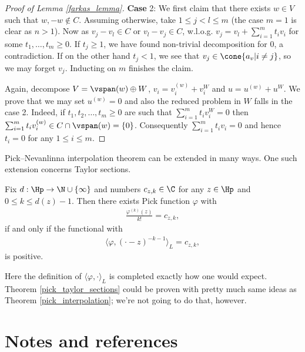 \begin{proof}[Proof of Lemma \ref{farkas_lemma}]
	\textbf{Case} 2: We first claim that there exists $w \in V$ such that $w, -w \notin C$. Assuming otherwise, take $1 \leq j < l \leq m$ (the case $m = 1$ is clear as $n > 1$). Now as $v_{j} - v_{l} \in C$ or $v_{l} - v_{j} \in C$, w.l.o.g. $v_{j} = v_{l} + \sum_{i = 1}^{m} t_{i} v_{i}$ for some $t_{1}, \ldots, t_{m} \geq 0$. If $t_{j} \geq 1$, we have found non-trivial decomposition for $0$, a contradiction. If on the other hand $t_{j} < 1$, we see that $v_{j} \in \cone\{a_{v} | i \neq j\}$, so we may forget $v_{j}$. Inducting on $m$ finishes the claim.

	Again, decompose $V = \vspan(w) \oplus W$, $v_{i} = v_{i}^{(w)} + v_{i}^{W}$ and $u = u^{(w)} + u^{W}$. We prove that we may set $u^{(w)} = 0$ and also the reduced problem in $W$ falls in the case 2. Indeed, if $t_{1}, t_{2}, \ldots, t_{m} \geq 0$ are such that $\sum_{i = 1}^{m} t_{i} v_{i}^{W} = 0$ then $\sum_{i = 1}^{m} t_{i} v_{i}^{(w)} \in C \cap \vspan(w) = \{0\}$. Consequently $\sum_{i = 1}^{m} t_{i} v_{i} = 0$ and hence $t_{i} = 0$ for any $1 \leq i \leq m$.
\end{proof}

\begin{huom}\label{taylor_section_rem}
	Pick--Nevanlinna interpolation theorem can be extended in many ways. One such extension concerns Taylor sections.
	\begin{lause}\label{pick_taylor_sections}
		Fix $d : \Hp \to \N \cup \{\infty\}$ and numbers $c_{z, k} \in \C$ for any $z \in \Hp$ and $0 \leq k \leq d(z) - 1$. Then there exists Pick function $\varphi$ with
		\begin{align*}
			\frac{\varphi^{(k)}(z)}{k!} = c_{z, k},
		\end{align*}
		if and only if the functional with
		\begin{align*}
			\langle \varphi, (\cdot - z)^{-k - 1}\rangle_{L} = c_{z, k},
		\end{align*}
		is positive.
	\end{lause}
	Here the definition of $\langle \varphi, \cdot\rangle_{L}$ is completed exactly how one would expect. Theorem \ref{pick_taylor_sections} could be proven with pretty much same ideas as Theorem \ref{pick_interpolation}; we're not going to do that, however.
\end{huom}

\section{Notes and references}

